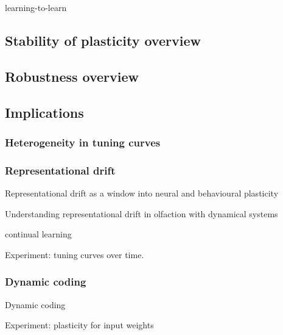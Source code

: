 \documentclass{article}
\theoremstyle{definition} \newtheorem{definition}{Definition}
\theoremstyle{remark} \newtheorem{remark}{Remark}
\newcounter{ct}
\begin{document}
\citep{tyulmankov2022meta}

\citep{kusmierz2017learning}

learning-to-learn \citep{bellec2018long}

\subsection{Stability of plasticity overview}
\citep{kuan1994convergence}

\subsection{Robustness overview}
\citep{revay2023recurrent, revay2020contracting}

\subsection{Implications}

\subsubsection{Heterogeneity in tuning curves}




\subsubsection{Representational drift}
\citep{wolff2020drifting}

\citep{masset2022drifting}

\citep{buschman2022wm}

Representational drift as a window into neural and behavioural plasticity \citep{micou2023representational}

Understanding representational drift in olfaction with dynamical  systems \citep{barwich2023drift}

continual learning \citep{driscoll2022representational}

Experiment: tuning curves over time.




\subsubsection{Dynamic coding}
Dynamic coding \citep{stroud2024computational}

Experiment: plasticity for input weights
\end{document}
